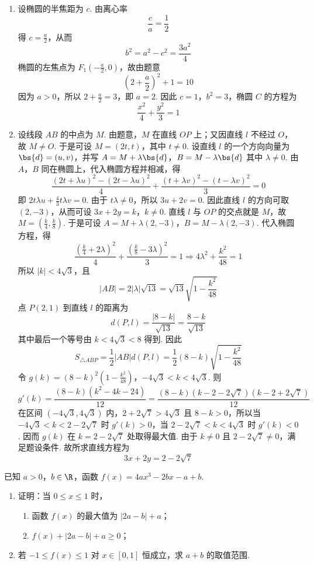 \begin{solution}
\begin{enumerate}
\item 设椭圆的半焦距为 \(c\). 由离心率
\[
\frac{c}{a}=\frac{1}{2}
\]
得 \(c=\frac{a}{2}\)，从而
\[
b^2=a^2-c^2=\frac{3a^2}{4}
\]
椭圆的左焦点为 \(F_1\left(-\frac{a}{2},0\right)\)，故由题意
\[
\left(2+\frac{a}{2}\right)^2+1=10
\]
因为 \(a>0\)，所以 \(2+\frac{a}{2}=3\)，即 \(a=2\). 因此
\(c=1\)，\(b^2=3\)，椭圆 \(C\) 的方程为
\[
\frac{x^2}{4}+\frac{y^2}{3}=1
\]

\item 设线段 \(AB\) 的中点为 \(M\). 由题意，\(M\) 在直线 \(OP\) 上；又因直线 \(l\) 不经过 \(O\)，故 \(M\neq O\). 于是可设 \(M=(2t,t)\)，其中 \(t\neq0\). 设直线 \(l\) 的一个方向向量为 \(\bs{d}=(u,v)\)，并写
\(A=M+\lambda\bs{d}\)，\(B=M-\lambda\bs{d}\)
其中 \(\lambda\neq0\). 由 \(A\)，\(B\) 同在椭圆上，代入椭圆方程并相减，得
\[
\frac{(2t+\lambda u)^2-(2t-\lambda u)^2}{4}+\frac{(t+\lambda v)^2-(t-\lambda v)^2}{3}=0
\]
即 \(2t\lambda u+\frac{4}{3}t\lambda v=0\). 由于 \(t\lambda\neq0\)，所以 \(3u+2v=0\). 因此直线 \(l\) 的方向可取 \((2,-3)\)，从而可设
\(3x+2y=k\)，\(k\neq0\).
直线 \(l\) 与 \(OP\) 的交点就是 \(M\)，故 \(M=\left(\frac{k}{4},\frac{k}{8}\right)\). 于是可设
\(A=M+\lambda(2,-3)\)，\(B=M-\lambda(2,-3)\).
代入椭圆方程，得
\[
\frac{(\frac{k}{4}+2\lambda)^2}{4}+\frac{(\frac{k}{8}-3\lambda)^2}{3}=1
\Longrightarrow 4\lambda^2+\frac{k^2}{48}=1
\]
所以 \(|k|<4\sqrt{3}\)，且
\[
|AB|=2|\lambda|\sqrt{13}=\sqrt{13}\sqrt{1-\frac{k^2}{48}}
\]
点 \(P(2,1)\) 到直线 \(l\) 的距离为
\[
d(P,l)=\frac{|8-k|}{\sqrt{13}}=\frac{8-k}{\sqrt{13}}
\]
其中最后一个等号由 \(k<4\sqrt{3}<8\) 得到. 因此
\[
S_{\triangle ABP}=\frac12|AB|d(P,l)=\frac12(8-k)\sqrt{1-\frac{k^2}{48}}
\]
令
\(g(k)=(8-k)^2\left(1-\frac{k^2}{48}\right)\)，\(-4\sqrt{3}<k<4\sqrt{3}\).
则
\[
g'(k)=\frac{(8-k)(k^2-4k-24)}{12}=\frac{(8-k)(k-2-2\sqrt{7})(k-2+2\sqrt{7})}{12}
\]
在区间 \((-4\sqrt{3},4\sqrt{3})\) 内，\(2+2\sqrt{7}>4\sqrt{3}\) 且 \(8-k>0\)，所以当 \(-4\sqrt{3}<k<2-2\sqrt{7}\) 时 \(g'(k)>0\)，当 \(2-2\sqrt{7}<k<4\sqrt{3}\) 时 \(g'(k)<0\). 因而 \(g(k)\) 在 \(k=2-2\sqrt{7}\) 处取得最大值. 由于 \(k\neq0\) 且 \(2-2\sqrt{7}\neq0\)，满足题设条件. 故所求直线方程为
\[
\boxed{3x+2y=2-2\sqrt{7}}
\]
\end{enumerate}
\end{solution}

\begin{problem}
已知 \(a > 0\)，\(b \in \R\)，函数 \(f(x) = 4ax^3 - 2bx - a + b\).
\begin{enumerate}
\item 证明：当 \(0 \leqslant x \leqslant 1\) 时，
\begin{enumerate}
\item 函数 \(f(x)\) 的最大值为 \(|2a-b|+a\)；
\item \(f(x)+|2a-b|+a\geqslant0\)；
\end{enumerate}
\item 若 \(-1 \leqslant f(x) \leqslant 1\) 对 \(x \in [0,1]\) 恒成立，求 \(a+b\) 的取值范围.
\end{enumerate}
\end{problem}

